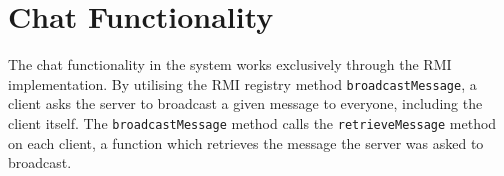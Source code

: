\section{Chat Functionality}
The chat functionality in the system works exclusively through the RMI implementation. By utilising the RMI registry method \texttt{broadcastMessage}, a client asks the server to broadcast a given message to everyone, including the client itself.
The \texttt{broadcastMessage} method calls the \texttt{retrieveMessage} method on each client, a function which retrieves the message the server was asked to broadcast.
